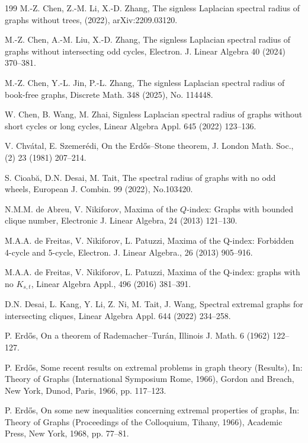 \documentclass[11pt,a4paper]{article}
\theoremstyle{plain}
\theoremstyle{definition}
\begin{document}
\begin{thebibliography}{199}
M.-Z. Chen, Z.-M. Li, X.-D. Zhang, 
The signless Laplacian spectral radius of graphs without trees, (2022), arXiv:2209.03120. 

M.-Z. Chen, A.-M. Liu, X.-D. Zhang,
The signless Laplacian spectral radius of graphs without
intersecting odd cycles,
Electron. J. Linear Algebra 40 (2024) 370--381. 

M.-Z. Chen, Y.-L. Jin, P.-L. Zhang, 
The signless Laplacian spectral radius of book-free graphs, 
Discrete Math. 348 (2025), No. 114448. 

W. Chen, B. Wang, M. Zhai, 
Signless Laplacian spectral radius of graphs without short cycles or long cycles, 
Linear Algebra Appl. 645 (2022) 123--136.

V. Chv\'{a}tal, E. Szemer\'{e}di,
On the Erd\H{o}s--Stone theorem, 
J. London Math. Soc., (2) 23 (1981) 207--214. 


 S. Cioab\u{a}, D.N. Desai, M. Tait, 
The spectral radius of graphs with no odd wheels, 
European J. Combin. 99 (2022), No.103420. 

N.M.M. de Abreu, V. Nikiforov, Maxima of the $Q$-index: Graphs with bounded clique number,
 {Electronic J. Linear Algebra}, 24 (2013) 121--130.

M.A.A. de Freitas, V. Nikiforov, L. Patuzzi, Maxima of the Q-index: Forbidden 4-cycle and 5-cycle, {Electron. J. Linear Algebra.}, 26 (2013) 905--916.

M.A.A. de Freitas, V. Nikiforov, L. Patuzzi, Maxima of the Q-index: graphs with no $K_{s,t}$, 
{Linear Algebra Appl.}, 496 (2016) 381--391.


D.N. Desai, L. Kang, Y. Li, Z. Ni, M. Tait, J. Wang, 
Spectral extremal graphs for intersecting cliques, 
Linear Algebra Appl. 644 (2022) 234--258.  
 
 
P. Erd\H{o}s,
On a theorem of Rademacher--Tur\'{a}n,
Illinois J. Math. 6 (1962) 122--127.  

P. Erd\H{o}s, Some recent results on extremal problems in graph theory (Results), In: Theory of Graphs (International Symposium Rome, 1966), Gordon and Breach, New York, Dunod, Paris, 1966, pp. 117--123.

P. Erd\H{o}s, On some new inequalities concerning extremal properties of graphs, In: Theory of Graphs (Proceedings of the Colloquium, Tihany, 1966), Academic Press, New York, 1968, pp. 77--81.  


\end{thebibliography}
\end{document}
